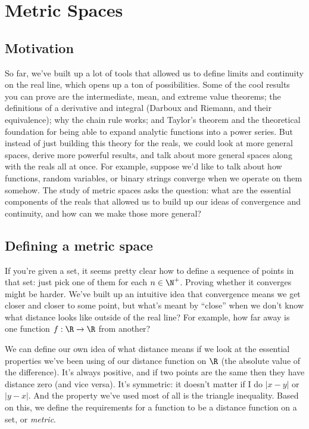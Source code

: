 \documentclass[./analysis.tex]{subfiles}
\begin{document}
    \section{Metric Spaces}
    \subsection{Motivation}

    So far, we've built up a lot of tools that allowed us to define limits and continuity on the real line, which opens up a ton of possibilities. Some of the cool results you can prove are the intermediate, mean, and extreme value theorems; the definitions of a derivative and integral (Darboux and Riemann, and their equivalence); why the chain rule works; and Taylor's theorem and the theoretical foundation for being able to expand analytic functions into a power series. But instead of just building this theory for the reals, we could look at more general spaces, derive more powerful results, and talk about more general spaces along with the reals all at once.
    For example, suppose we'd like to talk about how functions, random variables, or binary strings converge when we operate on them somehow. The study of metric spaces asks the question: what are the essential components of the reals that allowed us to build up our ideas of convergence and continuity, and how can we make those more general?

    \subsection{Defining a metric space}

    If you're given a set, it seems pretty clear how to define a sequence of points in that set: just pick one of them for each $n \in \N^+$. Proving whether it converges might be harder. We've built up an intuitive idea that convergence means we get closer and closer to some point, but what's meant by ``close'' when we don't know what distance looks like outside of the real line? For example, how far away is one function $f: \R \to \R$ from another?

    We can define our own idea of what distance means if we look at the essential properties we've been using of our distance function on $\R$ (the absolute value of the difference). It's always positive, and if two points are the same then they have distance zero (and vice versa). It's symmetric: it doesn't matter if I do $|x - y|$ or $|y - x|$. And the property we've used most of all is the triangle inequality. Based on this, we define the requirements for a function to be a distance function on a set, or \emph{metric}.
\end{document}
